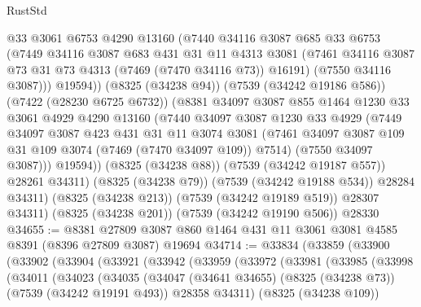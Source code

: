 \begin{lexlean}{RustStd}
\begin{coremodule}
                @33
                @3061
                @6753
                @4290
                @13160
                (@7440
                  @34116
                  @3087
                  @685
                  @33
                  @6753
                  (@7449
                    @34116
                    @3087
                    @683
                    @431
                    @31
                    @11
                    @4313
                    @3081
                    (@7461 @34116 @3087 @73 @31 @73 @4313 (@7469 (@7470 @34116 @73)) @16191)
                    (@7550 @34116 @3087)))
                @19594))
            (@8325 (@34238 @94))
            (@7539 (@34242 @19186 @586))
            (@7422 (@28230 @6725 @6732))
            (@8381
              @34097
              @3087
              @855
              @1464
              @1230
              @33
              @3061
              @4929
              @4290
              @13160
              (@7440
                @34097
                @3087
                @1230
                @33
                @4929
                (@7449
                  @34097
                  @3087
                  @423
                  @431
                  @31
                  @11
                  @3074
                  @3081
                  (@7461 @34097 @3087 @109 @31 @109 @3074 (@7469 (@7470 @34097 @109)) @7514)
                  (@7550 @34097 @3087)))
              @19594))
          (@8325 (@34238 @88))
          (@7539 (@34242 @19187 @557))
          @28261
          @34311)
        (@8325 (@34238 @79))
        (@7539 (@34242 @19188 @534))
        @28284
        @34311)
      (@8325 (@34238 @213))
      (@7539 (@34242 @19189 @519))
      @28307
      @34311)
    (@8325 (@34238 @201))
    (@7539 (@34242 @19190 @506))
    @28330
@34655 := @8381 @27809 @3087 @860 @1464 @431 @11 @3061 @3081 @4585 @8391 (@8396 @27809 @3087) @19694
@34714 := @33834
    (@33859
      (@33900
        (@33902
          (@33904
            (@33921
              (@33942
                (@33959
                  (@33972
                    (@33981
                      (@33985
                        (@33998
                          (@34011
                            (@34023
                              (@34035
                                (@34047
                                  (@34641 @34655)
                                  (@8325 (@34238 @73))
                                  (@7539 (@34242 @19191 @493))
                                  @28358
                                  @34311)
                                (@8325 (@34238 @109))

\end{coremodule}
\end{lexlean}
